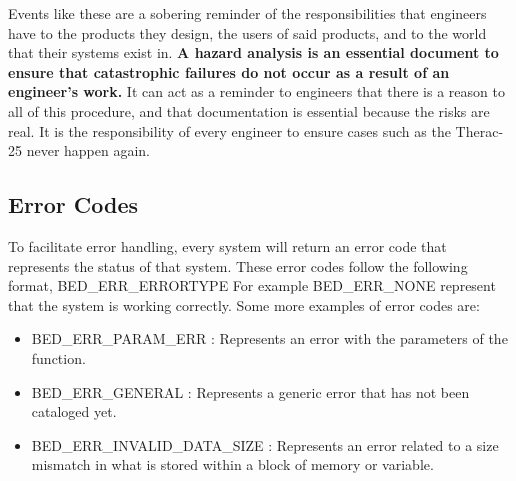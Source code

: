 \documentclass{article}
\begin{document}
Events like these are a sobering reminder of the responsibilities that engineers have to the products they design, the users of said products, and to the world that their systems exist in. \textbf{A hazard analysis is an essential document to ensure that catastrophic failures do not occur as a result of an engineer's work.} It can act as a reminder to engineers that there is a reason to all of this procedure, and that documentation is essential because the risks are real. It is the responsibility of every engineer to ensure cases such as the Therac-25 never happen again.\\


\subsection*{Error Codes}
To facilitate error handling, every system will return an error code that represents the status of that system. These error codes follow the following format, BED\_ERR\_ERRORTYPE
For example BED\_ERR\_NONE represent that the system is working correctly. Some more examples of error codes are:
\begin{itemize}
	\item BED\_ERR\_PARAM\_ERR		 	: Represents an error with the parameters of the function.
	\item BED\_ERR\_GENERAL			 	: Represents a generic error that has not been cataloged yet.
	\item BED\_ERR\_INVALID\_DATA\_SIZE	: Represents an error related to a size mismatch in what is stored within a block of memory or variable.
\end{itemize}


































\end{document}
